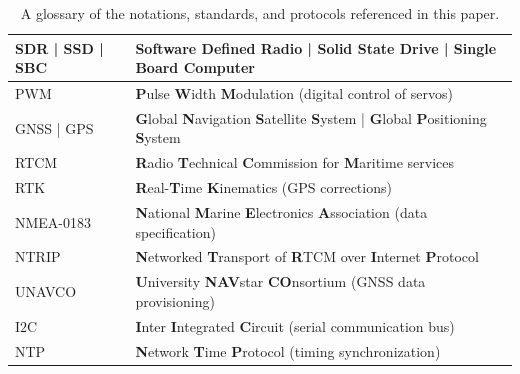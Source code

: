\documentclass[12pt, draftcls, onecolumn]{IEEEtran}
\begin{document}
\begin{table} [tb]
\begin{tabular}{|l||l|}
		\hline
		SDR | SSD | SBC & \textbf{S}oftware \textbf{D}efined \textbf{R}adio | \textbf{S}olid \textbf{S}tate \textbf{D}rive | \textbf{S}ingle \textbf{B}oard \textbf{C}omputer\\
		\hline
		PWM & \textbf{P}ulse \textbf{W}idth \textbf{M}odulation (digital control of servos)\\
		\hline
		GNSS | GPS & \textbf{G}lobal \textbf{N}avigation \textbf{S}atellite \textbf{S}ystem | \textbf{G}lobal \textbf{P}ositioning \textbf{S}ystem\\
		\hline
		RTCM & \textbf{R}adio \textbf{T}echnical \textbf{C}ommission for \textbf{M}aritime services\\
		\hline
		RTK & \textbf{R}eal-\textbf{T}ime \textbf{K}inematics (GPS corrections)\\
		\hline
		NMEA-0183 & \textbf{N}ational \textbf{M}arine \textbf{E}lectronics \textbf{A}ssociation (data specification)\\
		\hline
		NTRIP & \textbf{N}etworked \textbf{T}ransport of \textbf{R}TCM over \textbf{I}nternet \textbf{P}rotocol\\
		\hline
		UNAVCO & \textbf{U}niversity \textbf{NAV}star \textbf{CO}nsortium (GNSS data provisioning)\\
		\hline
		I$2$C & \textbf{I}nter \textbf{I}ntegrated \textbf{C}ircuit (serial communication bus)\\
		\hline
		NTP & \textbf{N}etwork \textbf{T}ime \textbf{P}rotocol (timing synchronization)\\
		\hline
	\end{tabular}
	\vspace{-1mm}
	\caption{A glossary of the notations, standards, and protocols referenced in this paper.}
	\label{T1}
\end{table}
\end{document}
